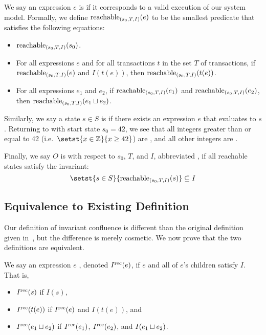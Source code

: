 {}

We say an expression $e$ is  if it corresponds to a
valid execution of our system model. Formally, we define
$\text{reachable}_{(s_0, T, I)}(e)$ to be the smallest predicate that satisfies the
following equations:
\begin{itemize}
  \item
    $\text{reachable}_{(s_0, T, I)}(s_0)$.
  \item
    For all expressions $e$ and for all transactions $t$ in the set $T$ of
    transactions, if $\text{reachable}_{(s_0, T, I)}(e)$ and $I(t(e))$, then
    $\text{reachable}_{(s_0, T, I)}(t(e))$.
  \item
    For all expressions $e_1$ and $e_2$, if $\text{reachable}_{(s_0, T, I)}(e_1)$ and
    $\text{reachable}_{(s_0, T, I)}(e_2)$, then $\text{reachable}_{(s_0, T, I)}(e_1 \sqcup
    e_2)$.
\end{itemize}
Similarly, we say a state $s \in S$ is \sTIreachable{} if there exists an
\sTIreachable{} expression $e$ that evaluates to $s$. Returning to
 with start state $s_0 = 42$, we see that all integers greater
than or equal to 42 (i.e.\ $\setst{x \in \ints}{x \geq 42}$) are
\sTIreachable{}, and all other integers are \sTIunreachable{}.

Finally, we say $O$ is  with respect to $s_0$,
$T$, and $I$, abbreviated , if all reachable states
satisfy the invariant:
\[
  \hfill
  \setst{s \in S}{\sTIreachablepredicate{s}} \subseteq I
  \hfill
\]

\subsection{Equivalence to Existing Definition}
Our definition of invariant confluence is different than the original
definition given in~\cite{bailis2014coordination}, but the difference is merely
cosmetic. We now prove that the two definitions are equivalent.

We say an expression $e$ , denoted
$I^{\text{rec}}(e)$, if $e$ and all of $e$'s children satisfy $I$. That is,
\begin{itemize}
  \item
    $I^{\text{rec}}(s)$ if $I(s)$,

  \item
    $I^{\text{rec}}(t(e))$ if $I^{\text{rec}}(e)$ and $I(t(e))$, and

  \item
    $I^{\text{rec}}(e_1 \sqcup e_2)$ if $I^{\text{rec}}(e_1)$, $I^{\text{rec}}(e_2)$, and $I(e_1 \sqcup
    e_2)$.
\end{itemize}

